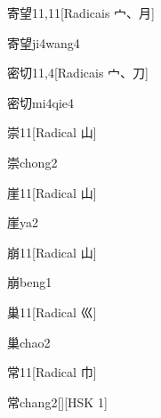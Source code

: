 \begin{entry}{寄望}{11,11}[Radicais ⼧、⽉]
  \begin{phonetics}{寄望}{ji4wang4}
  \end{phonetics}
\end{entry}

\begin{entry}{密切}{11,4}[Radicais ⼧、⼑]
  \begin{phonetics}{密切}{mi4qie4}
  \end{phonetics}
\end{entry}

\begin{entry}{崇}{11}[Radical ⼭]
  \begin{phonetics}{崇}{chong2}
  \end{phonetics}
\end{entry}

\begin{entry}{崖}{11}[Radical ⼭]
  \begin{phonetics}{崖}{ya2}
  \end{phonetics}
\end{entry}

\begin{entry}{崩}{11}[Radical ⼭]
  \begin{phonetics}{崩}{beng1}
  \end{phonetics}
\end{entry}

\begin{entry}{巢}{11}[Radical ⼮]
  \begin{phonetics}{巢}{chao2}
  \end{phonetics}
\end{entry}

\begin{entry}{常}{11}[Radical ⼱]
  \begin{phonetics}{常}{chang2}[][HSK 1]
  \end{phonetics}
\end{entry}

